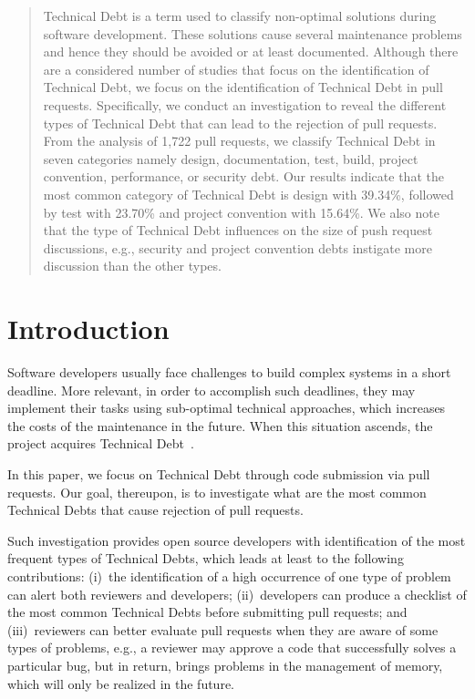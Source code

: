 \documentclass{sig-alternate}
\begin{document}
	\maketitle
	
	
\begin{abstract}
Technical Debt is a term used to classify non-optimal solutions during software development. 
These solutions cause several maintenance problems and hence they should be avoided or at least documented.
Although there are a considered number of studies that focus on the identification of Technical Debt, we focus on the identification of Technical Debt in pull requests. 
Specifically, we conduct an investigation to reveal the different types of Technical Debt that can lead to the rejection of pull requests. 
From the analysis of 1,722 pull requests, we classify Technical Debt in seven categories namely design, documentation, test, build, project convention, performance, or security debt. 
Our results indicate that the most common category of Technical Debt is design with 39.34\%, followed by test with 23.70\% and project convention with 15.64\%. 
We also note that the
type of Technical Debt influences on the size of push request discussions, e.g., security and project convention debts instigate more discussion than the other types.
\end{abstract}




\section{Introduction}
Software developers usually face challenges to build complex systems in a short deadline. More relevant, in order to accomplish such deadlines, they may implement their tasks using sub-optimal technical approaches, which increases the costs of the maintenance in the future. When this situation ascends, the project acquires Technical Debt~\cite{4}. 

In this paper, we focus on Technical Debt through code submission via pull requests. Our goal, thereupon, is to investigate  what are the most common Technical Debts that cause rejection of pull requests.

Such investigation provides open source developers with identification of the most frequent types of Technical Debts,
which leads
at least to the following contributions:
(i)~the identification of a high occurrence of one type of problem can alert both reviewers and developers;
(ii)~developers can produce a checklist of the most common Technical Debts before submitting pull requests;
and 
(iii)~reviewers can better evaluate pull requests when they are 
aware of some types of problems, e.g., a reviewer may approve a code that successfully solves a particular bug, but in return, brings problems in the management of memory, which will only be realized in the future. 
\end{document}
